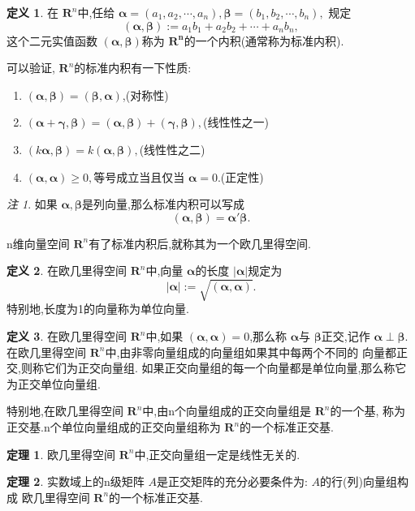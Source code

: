 \documentclass[a4paper,11pt]{article}%
\theoremstyle{remark}
\newtheorem*{remark}{注}
\theoremstyle{definition}
\newtheorem{theorem}{定理}[section]
\theoremstyle{definition}
\newtheorem*{definition}{定义}
\theoremstyle{plain}
\newcommand*{\abs}[1]{\lvert #1 \rvert}
\begin{document}
\begin{definition}
    在 $\mathbf{R}^n $中,任给 $\bm{\alpha}=(a_1,a_2,\cdots,a_n),\bm{\beta}=(b_1,b_2,\cdots,b_n),$
    规定
    \[(\bm{\alpha},\bm{\beta}):=a_1b_1+a_2b_2+\cdots+a_nb_n,\]
    这个二元实值函数 $(\bm{\alpha},\bm{\beta})$称为 $\mathbf{R^n}$的一个内积(通常称为标准内积).
\end{definition}
可以验证, $\mathbf{R}^n$的标准内积有一下性质:
\begin{enumerate}
    \item $(\bm{\alpha},\bm{\beta})=(\bm{\beta},\bm{\alpha})$,(对称性)
    \item $(\bm{\alpha}+\bm{\gamma},\bm{\beta})=(\bm{\alpha},\bm{\beta})+(\bm{\gamma},\bm{\beta}),$(线性性之一)
    \item $(k \bm{\alpha},\bm{\beta})=k(\bm{\alpha},\bm{\beta}),$(线性性之二)
    \item $(\bm{\alpha},\bm{\alpha})\geq 0,$等号成立当且仅当 $\bm{\alpha}=0$.(正定性)
\end{enumerate}
\begin{remark}
    如果 $\bm{\alpha},\bm{\beta}$是列向量,那么标准内积可以写成
    \[(\bm{\alpha},\bm{\beta})=\bm{\alpha}'\bm{\beta}.\]
\end{remark}
n维向量空间 $\mathbf{R}^n$有了标准内积后,就称其为一个欧几里得空间.
\begin{definition}
在欧几里得空间 $\mathbf{R}^n$中,向量 $\bm{\alpha}$的长度 $\abs{\bm{\alpha}}$规定为
\[\abs{\bm{\alpha}}:=\sqrt{(\bm{\alpha},\bm{\alpha})}.\]
特别地,长度为1的向量称为单位向量.
\end{definition}
\begin{definition}
    在欧几里得空间 $\mathbf{R}^n$中,如果 $(\bm{\alpha},\bm{\alpha})=0$,那么称 $\bm{\alpha}$与
    $\bm{\beta}$正交,记作 $\bm{\alpha}\perp \bm{\beta}$.
    在欧几里得空间 $\mathbf{R}^n$中,由非零向量组成的向量组如果其中每两个不同的
    向量都正交,则称它们为正交向量组.
    如果正交向量组的每一个向量都是单位向量,那么称它为正交单位向量组.

    特别地,在欧几里得空间 $\mathbf{R}^n$中,由n个向量组成的正交向量组是 $\mathbf{R}^n$的一个基,
    称为正交基.n个单位向量组成的正交向量组称为 $\mathbf{R}^n$的一个标准正交基.
\end{definition}
\begin{theorem}
    欧几里得空间 $\mathbf{R}^n$中,正交向量组一定是线性无关的.
\end{theorem}
\begin{theorem}
    实数域上的n级矩阵 $A$是正交矩阵的充分必要条件为: $A$的行(列)向量组构成
    欧几里得空间 $\mathbf{R}^n$的一个标准正交基.
\end{theorem}
\end{document}
